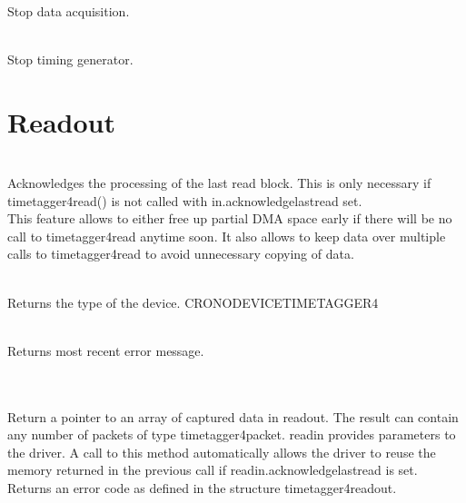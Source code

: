 			\\
			Stop data acquisition.\par

			\\
			Stop timing generator.\par

	\section{Readout\label{cp:readout}}

		 \\
		Acknowledges the processing of the last read block. This is only necessary if \textsf{timetagger4\tu read()} is not called with 
		\textsf{in.acknowledge\tu last\tu read} set.\\
		This feature allows to either free up partial DMA space early if there will be no call to \textsf{timetagger4\tu read} anytime soon. 
		It also allows to keep data over multiple calls to \textsf{timetagger4\tu read} to avoid unnecessary copying of data. \par

		\\
		Returns the type of the device.	\textsf{CRONO\tu DEVICE\tu TIMETAGGER4}\par

		\\
		Returns most recent error message.\par

		  \\ \\
		Return a pointer to an array of captured data in \textsf{read\tu out}. 
		The result can contain any number of packets of type \textsf{timetagger4\tu packet}.
		\textsf{read\tu in} provides parameters to the driver. 
		A call to this method automatically allows the driver to reuse the memory returned in the previous call if \textsf{read\tu in.acknowledge\tu last\tu read} is set.\\
		Returns an error code as defined in the structure \textsf{timetagger4\tu read\tu out}.

